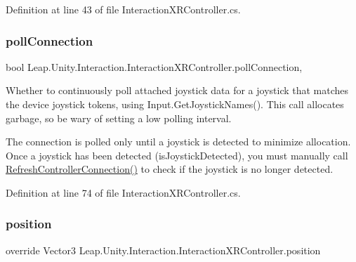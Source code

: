 Definition at line 43 of file Interaction\+X\+R\+Controller.\+cs.

\mbox{\label{class_leap_1_1_unity_1_1_interaction_1_1_interaction_x_r_controller_a96ffe3a41a49ca69c3e15de4badbb98b}} 
\subsubsection{\texorpdfstring{pollConnection}{pollConnection}}
{\footnotesize\ttfamily bool Leap.\+Unity.\+Interaction.\+Interaction\+X\+R\+Controller.\+poll\+Connection\hspace{0.3cm}{\ttfamily [get]}, {\ttfamily [set]}}



Whether to continuously poll attached joystick data for a joystick that matches the device joystick tokens, using Input.\+Get\+Joystick\+Names(). This call allocates garbage, so be wary of setting a low polling interval. 

The connection is polled only until a joystick is detected to minimize allocation. Once a joystick has been detected (is\+Joystick\+Detected), you must manually call \mbox{\hyperlink{class_leap_1_1_unity_1_1_interaction_1_1_interaction_x_r_controller_a84947d3cd2c236dab7849e2d805465b6}{Refresh\+Controller\+Connection()}} to check if the joystick is no longer detected. 

Definition at line 74 of file Interaction\+X\+R\+Controller.\+cs.

\mbox{\label{class_leap_1_1_unity_1_1_interaction_1_1_interaction_x_r_controller_aaaa34551dbab0d0a98f1ab22f85adaa6}} 
\subsubsection{\texorpdfstring{position}{position}}
{\footnotesize\ttfamily override Vector3 Leap.\+Unity.\+Interaction.\+Interaction\+X\+R\+Controller.\+position\hspace{0.3cm}{\ttfamily [get]}}



